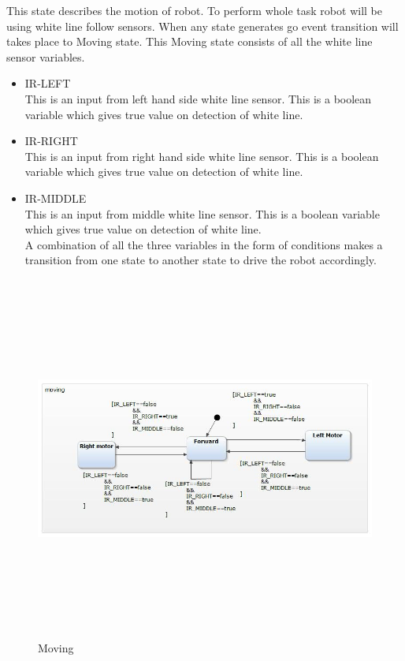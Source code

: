 \documentclass[a4paper,12pt,oneside]{article}
\begin{document}
\begin{enumerate}
This state describes the motion of robot. To perform whole task robot will be using white line follow sensors. When any state generates go event transition will takes place to Moving state. This Moving state consists of all the white line sensor variables.\\
\begin{itemize}
 \item IR-LEFT\\
 This is an input from left hand side white line sensor. This is a boolean variable which gives true value on detection of white line.
 \item IR-RIGHT\\
  This is an input from right hand side white line sensor. This is a boolean variable which gives true value on detection of white line.
 \item IR-MIDDLE\\
  This is an input from middle white line sensor. This is a boolean variable which gives true value on detection of white line.\\
  A combination of all the three variables in the form of conditions makes a transition from one state to another state to drive the robot accordingly.
\end{itemize}
\begin{figure}[H]
\centering
\includegraphics[width=16cm,height=12cm]{61.jpg}
\caption{Moving}
\end{figure}
\end{enumerate}
\newpage
\end{document}
